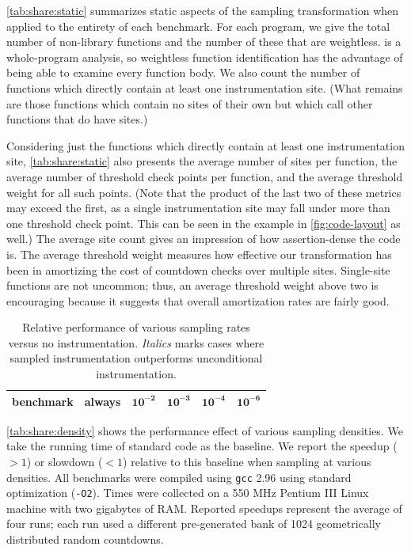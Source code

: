 \autoref{tab:share:static} summarizes static aspects of the sampling
transformation when applied to the entirety of each benchmark.  For
each program, we give the total number of non-library functions and
the number of these that are weightless.  \CCured is a whole-program
analysis, so weightless function identification has the advantage of
being able to examine every function body.  We also count the number
of functions which directly contain at least one instrumentation site.
(What remains are those functions which contain no sites of their own
but which call other functions that do have sites.)

Considering just the functions which directly contain at least one
instrumentation site, \autoref{tab:share:static} also presents the
average number of sites per function, the average number of threshold
check points per function, and the average threshold weight for all
such points.  (Note that the product of the last two of these metrics
may exceed the first, as a single instrumentation site may fall under
more than one threshold check point.  This can be seen in the example
in \autoref{fig:code-layout} as well.)  The average site count gives
an impression of how assertion-dense the code is.  The average
threshold weight measures how effective our transformation has been in
amortizing the cost of countdown checks over multiple sites.
Single-site functions are not uncommon; thus, an average threshold
weight above two is encouraging because it suggests that overall
amortization rates are fairly good.

\begin{table}
  \centering
  \begin{tabular}{|l|r|rrrr|}
    \hline
    \rule{0pt}{2.5ex}
    \textbf{benchmark} & \textbf{always} & $\mathbf{10^{-2}}$ & $\mathbf{10^{-3}}$ & $\mathbf{10^{-4}}$ & $\mathbf{10^{-6}}$ \\
    \hline\hline
    
  \end{tabular}
  \caption{Relative performance of various sampling rates versus no
    instrumentation.  \textit{Italics} marks cases where sampled
    instrumentation outperforms unconditional instrumentation.}
  \label{tab:share:density}
\end{table}

\autoref{tab:share:density} shows the performance effect of various
sampling densities.  We take the running time of standard \CCured code
as the baseline.  We report the speedup ($>1$) or slowdown ($<1$)
relative to this baseline when sampling at various densities.  All
benchmarks were compiled using \texttt{gcc} 2.96 using standard
optimization (\texttt{-O2}).  Times were collected on a 550 MHz
Pentium III Linux machine with two gigabytes of RAM\@.  Reported
speedups represent the average of four runs; each run used a different
pre-generated bank of 1024 geometrically distributed random
countdowns.

